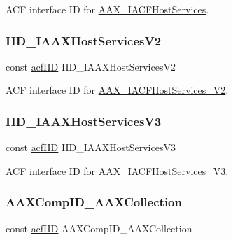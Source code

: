 A\+CF interface ID for \mbox{\hyperlink{a01713}{A\+A\+X\+\_\+\+I\+A\+C\+F\+Host\+Services}}. 

\mbox{\label{a00683_a19fae45f6510abfe803b5513bf3f2b85}} 
\subsubsection{\texorpdfstring{IID\_IAAXHostServicesV2}{IID\_IAAXHostServicesV2}}
{\footnotesize\ttfamily const \mbox{\hyperlink{a00269_a59df0b41744eee7a066787aaedf97f67}{acf\+I\+ID}} I\+I\+D\+\_\+\+I\+A\+A\+X\+Host\+Services\+V2}



A\+CF interface ID for \mbox{\hyperlink{a01717}{A\+A\+X\+\_\+\+I\+A\+C\+F\+Host\+Services\+\_\+\+V2}}. 

\mbox{\label{a00683_ac6e4f090679f63cbed6538c9b08dc119}} 
\subsubsection{\texorpdfstring{IID\_IAAXHostServicesV3}{IID\_IAAXHostServicesV3}}
{\footnotesize\ttfamily const \mbox{\hyperlink{a00269_a59df0b41744eee7a066787aaedf97f67}{acf\+I\+ID}} I\+I\+D\+\_\+\+I\+A\+A\+X\+Host\+Services\+V3}



A\+CF interface ID for \mbox{\hyperlink{a01721}{A\+A\+X\+\_\+\+I\+A\+C\+F\+Host\+Services\+\_\+\+V3}}. 

\mbox{\label{a00683_adce9a55e7654b4bb7e41cdc8d91d119d}} 
\subsubsection{\texorpdfstring{AAXCompID\_AAXCollection}{AAXCompID\_AAXCollection}}
{\footnotesize\ttfamily const \mbox{\hyperlink{a00269_a59df0b41744eee7a066787aaedf97f67}{acf\+I\+ID}} A\+A\+X\+Comp\+I\+D\+\_\+\+A\+A\+X\+Collection}



